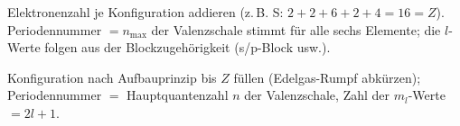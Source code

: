 \begin{kontrolle}
Elektronenzahl je Konfiguration addieren (z.\,B. S: $2{+}2{+}6{+}2{+}4 =
16 = Z$). Periodennummer $= n_{\text{max}}$ der Valenzschale stimmt für alle
sechs Elemente; die $l$-Werte folgen aus der Blockzugehörigkeit (s/p-Block
usw.).
\end{kontrolle}

\begin{merksatz}
Konfiguration nach Aufbauprinzip bis $Z$ füllen (Edelgas-Rumpf abkürzen);
Periodennummer $= $ Hauptquantenzahl $n$ der Valenzschale, Zahl der $m_l$-Werte
$= 2l+1$.
\end{merksatz}
